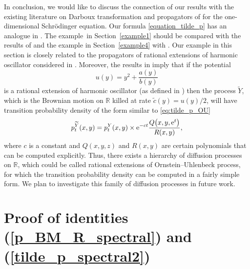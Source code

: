\documentclass[10pt,a4paper]{amsart}
\numberwithin{equation}{section}
\theoremstyle{definition}
\def\r{{\mathbb R}}
\begin{document}
In conclusion, we would like to discuss the connection of our results with the existing literature on Darboux transformation and propagators of
for the one-dimensional Schr\"odinger equation. Our formula \eqref{equation_tilde_p} has an analogue in \cite[Theorem~2]{Pupasov_2007}.
The example~in Section~\ref{example1} should be compared with the results of \cite{Pupasov_2005} and the example in Section~\ref{example4} with \cite[Example~5.1]{Pupasov_2007}.
Our example in this section is closely related to the propagators of rational extensions of harmonic oscillator considered in \cite{Pupasov_2015}. Moreover, the results in \cite{Pupasov_2015} imply that if the potential
\[
u(y)=y^2 + \frac{a(y)}{b(y)}
\]
is a rational extension of harmonic oscillator (as defined in \cite{Ullate_2014}) then the process $\widetilde Y$, which is the Brownian motion on $\r$ killed at rate $\tilde c(y)=u(y)/2$, will have transition probability density of the form similar to \eqref{eq:tilde_p_OU}
\[
p_t^{\widetilde Y}(x,y)=p_t^Y(x,y) \times {\rm e}^{-c t} \frac{Q\bigl(x,y,{\rm e}^{t}\bigr)}{R(x,y)},
\]
where $c$ is a constant and $Q(x,y,z)$ and $R(x,y)$ are certain polynomials that can be computed explicitly. Thus, there exists a hierarchy of diffusion processes on $\r$, which could be called rational extensions of Ornstein--Uhlenbeck process, for which the transition probability density can be computed in a fairly simple form. We plan to investigate this family of diffusion processes in future work.


\appendix

\section[Proof of identities (5.7) and (5.8)]{Proof of identities (\ref{p_BM_R_spectral}) and (\ref{tilde_p_spectral2})}\label{AppendixA}
\end{document}
